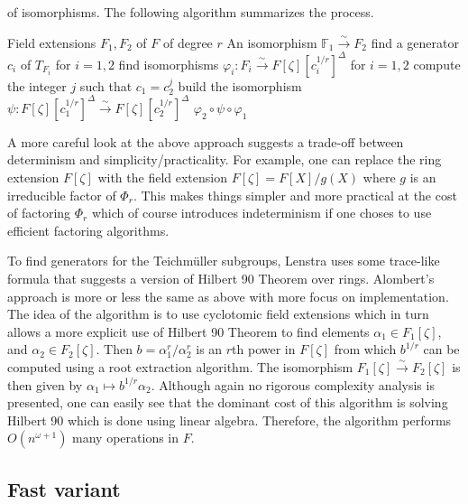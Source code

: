 \documentclass[12pt]{article}
\theoremstyle{plain}
\theoremstyle{definition}
\def\F{\ensuremath{\mathbb{F}}}
\newcounter{algorithm}
\begin{document}
of isomorphisms. The following algorithm summarizes the process.
\begin{algorithm}[Lenstra]
	\begin{algorithmic}[1]
		\REQUIRE Field extensions $F_1, F_2$ of $F$ of degree $r$
		\ENSURE An isomorphism $\F_1 \xrightarrow{\sim} F_2$
		\STATE find a generator $c_i$ of $T_{F_i}$ for $i = 1, 2$
		\STATE find isomorphisms $\varphi_i: F_i \xrightarrow{\sim} F[\zeta][c_i^{1/r}]^\Delta$ for 
		$i = 1, 2$
		\STATE compute the integer $j$ such that $c_1 = c_2^j$
		\STATE build the isomorphism $\psi: F[\zeta][c_1^{1/r}]^\Delta \xrightarrow{\sim} 
		F[\zeta][c_2^{1/r}]^\Delta$
		\RETURN $\varphi_2 \circ \psi \circ \varphi_1$
	\end{algorithmic}
\end{algorithm}
A more careful look at the above approach suggests a trade-off between determinism and 
simplicity/practicality. For example, one can replace the ring extension $F[\zeta]$ with the field 
extension $F[\zeta] = F[X] / g(X)$ where $g$ is an irreducible factor of $\Phi_r$. This makes 
things simpler and more practical at the cost of factoring $\Phi_r$ which of course introduces 
indeterminism if one choses to use efficient factoring algorithms.

To find generators for the Teichm\"{u}ller subgroups, Lenstra uses some trace-like formula that 
suggests a version of Hilbert 90 Theorem over rings. Alombert's approach is more or less the same 
as above with more focus on implementation. The idea of the algorithm is to use cyclotomic field 
extensions which in turn allows a more explicit use of Hilbert 90 Theorem to find elements 
$\alpha_1 \in F_1[\zeta]$, and $\alpha_2 \in F_2[\zeta]$. Then $b = \alpha_1^r / \alpha_2^r$ is an 
$r$th power in $F[\zeta]$ from which $b^{1/r}$ can be computed using a root extraction algorithm. 
The isomorphism $F_1[\zeta] \xrightarrow{\sim} F_2[\zeta]$ is then given by $\alpha_1 \mapsto 
b^{1/r}\alpha_2$. Although again no rigorous complexity analysis is presented, one can easily see 
that the dominant cost of this algorithm is solving Hilbert 90 which is done using linear algebra. 
Therefore, the algorithm performs $O(n^{\omega + 1})$ many operations in $F$.


\subsection{Fast variant}
\end{document}
